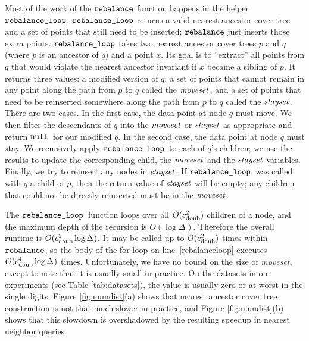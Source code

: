 \documentclass[thesis.tex]{subfiles}
\newcommand{\aspect}[1]{\Delta_{#1}}
\newcommand{\cdoub}{c_\textnormal{doub}}
\newcommand{\rebalance}{\ensuremath{\textnormal{\ttfamily rebalance}}}
\newcommand{\rebalanceHelper}{\ensuremath{\textnormal{\ttfamily rebalance\_loop}}}
\newcommand{\mkvar}[1]{\ensuremath{\textnormal{\textit{{#1}}}}}
\newcommand{\nullvar}{\ensuremath{\textup{\textnormal{\ttfamily null}}}}
\begin{document}
Most of the work of the $\rebalance$ function happens in the helper $\rebalanceHelper$.
$\rebalanceHelper$ returns a valid nearest ancestor cover tree and a set of points that still need to be inserted;
$\rebalance$ just inserts those extra points.
$\rebalanceHelper$ takes two nearest ancestor cover trees $p$ and $q$ (where $p$ is an ancestor of $q$) and a point $x$.
Its goal is to ``extract'' all points from $q$ that would violate the nearest ancestor invariant if $x$ became a sibling of $p$.
It returns three values:
a modified version of $q$,
a set of points that cannot remain in any point along the path from $p$ to $q$ called the \mkvar{moveset},
and a set of points that need to be reinserted somewhere along the path from $p$ to $q$ called the \mkvar{stayset}.
There are two cases.
In the first case, the data point at node $q$ must move.
We then filter the descendants of $q$ into the \mkvar{moveset} or \mkvar{stayset} as appropriate and return \nullvar\ for our modified $q$.
In the second case, the data point at node $q$ must stay.
We recursively apply \rebalanceHelper~to each of $q$'s children;
we use the results to update the corresponding child, the \mkvar{moveset} and the \mkvar{stayset} variables.
Finally, we try to reinsert any nodes in \mkvar{stayset}.
If \rebalanceHelper~was called with $q$ a child of $p$, then the return value of \mkvar{stayset} will be empty;
any children that could not be directly reinserted must be in the \mkvar{moveset}.

The \rebalanceHelper~function loops over all $O(\cdoub^2)$ children of a node, and the maximum depth of the recursion is $O(\log \aspect{})$.
Therefore the overall runtime is $O(\cdoub^2 \log \aspect{})$.
It may be called up to $O(\cdoub^2)$ times within \rebalance, 
so the body of the for loop on line~\ref{rebalanceloop} executes $O(\cdoub^4\log\aspect{})$ times.
Unfortunately, we have no bound on the size of \emph{moveset}, except to note that it is usually small in practice.
On the datasets in our experiments (see Table \ref{tab:datasets}), the value is usually zero or at worst in the single digits.
Figure \ref{fig:numdist}(a) shows that nearest ancestor cover tree construction is not that much slower in practice,
and Figure \ref{fig:numdist}(b) shows that this slowdown is overshadowed by the resulting speedup in nearest neighbor queries.
\end{document}
